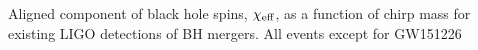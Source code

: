  \label{fig:BHspin} Aligned component of black hole spins, $\chi_{\rm eff}$, as a function of chirp mass for existing LIGO detections of BH mergers. All events except for GW151226 